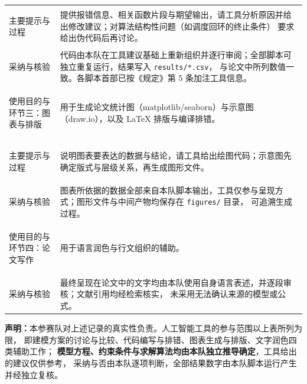 \documentclass[12pt,a4paper]{ctexart}
\begin{document}
\begin{longtable}{>{\bfseries\raggedright\arraybackslash}p{3.8cm}p{11.2cm}}
	主要提示与过程 &
	提供报错信息、相关函数片段与期望输出，请工具分析原因并给出修改建议；对算法结构性问题（如调度回环的终止条件）
	要求给出伪代码后再讨论。 \\
	采纳与核验 &
	代码由本队在工具建议基础上重新组织并逐行审阅；全部脚本可独立重复运行，结果写入 \texttt{results/*.csv}，
	与论文中所列数值一致。各脚本首部已按《规定》第 5 条加注工具信息。 \\
	\midrule
	使用目的与环节三：图表与排版 &
	用于生成论文统计图（matplotlib/seaborn）与示意图（draw.io），以及 \LaTeX{} 排版与编译排错。 \\
	主要提示与过程 &
	说明图表要表达的数据与结论，请工具给出绘图代码；示意图先确定版式与层级关系，再生成图形文件。 \\
	采纳与核验 &
	图表所依据的数据全部来自本队脚本输出，工具仅参与呈现方式；图形文件与中间产物均保存在 \texttt{figures/} 目录，
	可追溯生成过程。 \\
	\midrule
	使用目的与环节四：论文写作 &
	用于语言润色与行文组织的辅助。 \\
	采纳与核验 &
	最终呈现在论文中的文字均由本队使用自身语言表述，并逐段审核；文献引用均经检索核实，
	未采用无法确认来源的模型或公式。 \\
	\bottomrule
\end{longtable}

\vspace{1em}
\noindent\textbf{声明：}本参赛队对上述记录的真实性负责。人工智能工具的参与范围以上表所列为限，
即建模方案的讨论与比较、代码编写与排错、图表生成与排版、文字润色四类辅助工作；
\textbf{模型方程、约束条件与求解算法均由本队独立推导确定}，工具给出的建议仅供参考，
采纳与否由本队逐项判断，全部结果数字由本队脚本运行产生并经独立复核。
\end{document}
